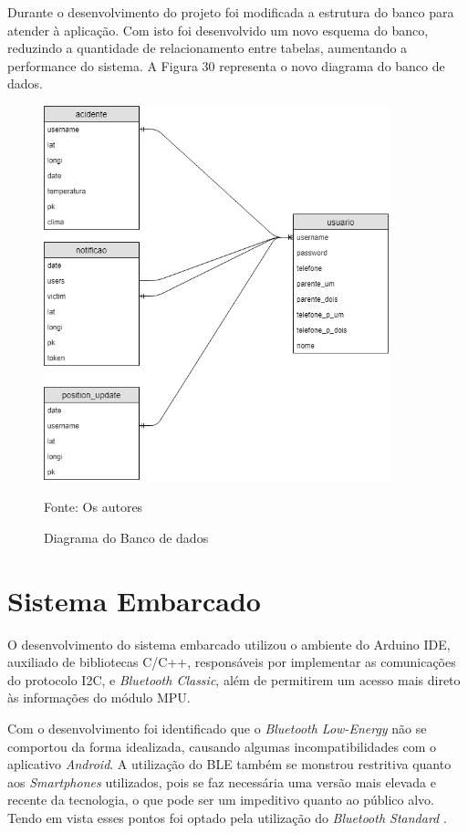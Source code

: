Durante o desenvolvimento do projeto foi modificada a estrutura do banco para atender à aplicação. Com isto foi desenvolvido um novo esquema do banco, reduzindo a quantidade de relacionamento entre tabelas, aumentando a performance do sistema. A Figura 30 representa o novo diagrama do banco de dados.

 \begin{figure}[H]

\begin{center}
     \caption{Diagrama do Banco de dados}
  \includegraphics[width=100mm]{images/Cap4/diagrama_banco.png}
\end{center}
 \scriptsize Fonte: Os autores
  
\end{figure}


\section{Sistema Embarcado}
 O desenvolvimento do sistema embarcado utilizou o ambiente do Arduino IDE, auxiliado de bibliotecas C/C++, responsáveis por implementar as comunicações do protocolo I2C, e \textit{Bluetooth Classic}, além de permitirem um acesso mais direto às informações do módulo MPU.
 
Com o desenvolvimento foi identificado que o \textit{Bluetooth Low-Energy} não se comportou da forma idealizada, causando algumas incompatibilidades com o aplicativo \textit{Android}. A utilização do BLE também se monstrou restritiva quanto aos \textit{Smartphones} utilizados, pois se faz necessária uma versão mais elevada e recente da tecnologia, o que pode ser um impeditivo quanto ao público alvo. Tendo em vista esses pontos foi optado pela utilização do \textit{Bluetooth Standard} . 

